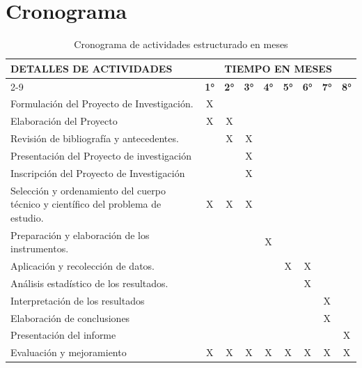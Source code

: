 \chapter{Cronograma}
    \begin{table}[H]
        \caption{Cronograma de actividades estructurado en meses}
        \label{tab:cronograma}
        \begin{tabularx}{\textwidth}{X *{8}{c}}
            \toprule
            \textbf{DETALLES DE ACTIVIDADES} & \multicolumn{8}{c}{\textbf{TIEMPO EN MESES}} \\
            \cmidrule(lr){2-9}
            & \textbf{1°} & \textbf{2°} & \textbf{3°} & \textbf{4°} & \textbf{5°} & \textbf{6°} & \textbf{7°} & \textbf{8°} \\
            \midrule
            Formulación del Proyecto de Investigación. & X &   &   &   &   &   &   &   \\
            \addlinespace

            Elaboración del Proyecto & X & X &   &   &   &   &   &   \\
            \addlinespace

            Revisión de bibliografía y antecedentes. &   & X & X &   &   &   &   &   \\
            \addlinespace

            Presentación del Proyecto de investigación &   &   & X &   &   &   &   &   \\
            \addlinespace

            Inscripción del Proyecto de Investigación &   &   & X &   &   &   &   &   \\
            \addlinespace

            Selección y ordenamiento del cuerpo técnico y científico del problema de estudio. & X & X & X &   &   &   &   &   \\
            \addlinespace

            Preparación y elaboración de los instrumentos. &   &   &   & X &   &   &   &   \\
            \addlinespace

            Aplicación y recolección de datos. &   &   &   &   & X & X &   &   \\
            \addlinespace

            Análisis estadístico de los resultados. &   &   &   &   &   & X &   &   \\
            \addlinespace

            Interpretación de los resultados &   &   &   &   &   &   & X &   \\
            \addlinespace

            Elaboración de conclusiones &   &   &   &   &   &   & X &   \\
            \addlinespace

            Presentación del informe &   &   &   &   &   &   &   & X \\
            \addlinespace

            Evaluación y mejoramiento & X & X & X & X & X & X & X & X \\
            \bottomrule
        \end{tabularx}
    \end{table}